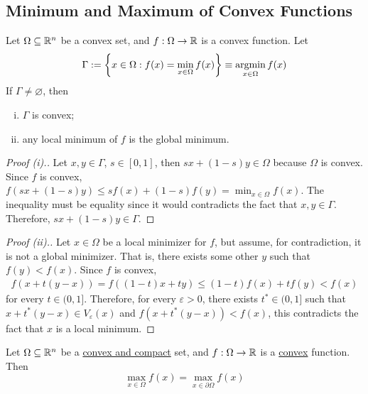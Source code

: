 \documentclass{article}
\begin{document}
    \subsection{Minimum and Maximum of Convex Functions}
    \begin{theorem}
        Let $\Omega \subseteq \mathbb{R}^n$ be a convex set, and $f: \Omega \to \mathbb{R}$ is a convex function. Let
        \begin{align}
        	\Gamma := \left\{x \in \Omega: f(x) = \min_{x \in \Omega} f(x) \right\} \equiv \operatorname*{argmin}_{x \in \Omega} f(x)
        \end{align}
        If $\Gamma \neq \varnothing$, then 
        \begin{enumerate}[(i)]
        	\item $\Gamma$ is convex;
        	\item any local minimum of $f$ is the global minimum.
        \end{enumerate}
    \end{theorem}
    
    \begin{proof}[Proof (i).]
    	Let $x, y \in \Gamma$, $s \in [0, 1]$, then $sx+(1-s)y \in \Omega$ because $\Omega$ is convex. Since $f$ is convex, $f(sx+(1-s)y) \leq sf(x) + (1-s)f(y) = \min_{x \in \Omega} f(x)$. The inequality must be equality since it would contradicts the fact that $x, y \in \Gamma$. Therefore, $sx+(1-s)y \in \Gamma$.
    \end{proof}
    
    \begin{proof}[Proof (ii).]
    	Let $x \in \Omega$ be a local minimizer for $f$, but assume, for contradiction, it is not a global minimizer. That is, there exists some other $y$ such that $f(y) < f(x)$. Since $f$ is convex, \begin{align}
 				f(x + t(y-x)) = f((1-t)x + ty) \leq (1-t)f(x) + tf(y) < f(x)
			\end{align}
			for every $t \in (0, 1]$. Therefore, for every $\varepsilon > 0$, there exists $t^* \in (0, 1]$ such that $x + t^*(y-x) \in V_\varepsilon(x)$ and $f(x + t^*(y-x)) < f(x)$, this contradicts the fact that $x$ is a local minimum.
    \end{proof}
    
    \begin{theorem}
        Let $\Omega \subseteq \mathbb{R}^n$ be a \ul{convex and compact} set, and $f: \Omega \to \mathbb{R}$ is a \ul{convex} function. Then 
        \begin{equation}
            \max_{x \in \Omega} f(x) = \max_{x \in \partial \Omega} f(x)
        \end{equation}
    \end{theorem}
    
\end{document}
